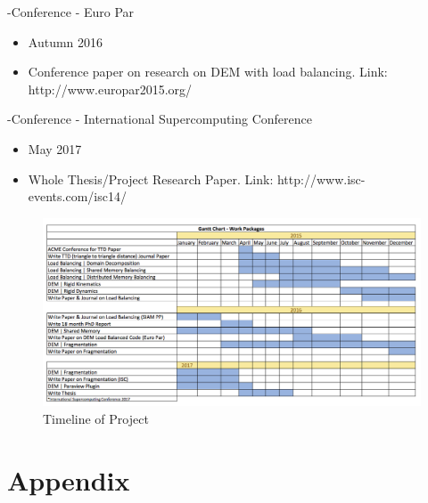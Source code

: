 \documentclass[times,12pt]{ACME2015article}
\begin{document}
-Conference - Euro Par
\begin{itemize}
\item Autumn 2016
\item Conference paper on research on DEM with load balancing. Link: http://www.europar2015.org/
\end{itemize}

-Conference - International Supercomputing Conference
\begin{itemize}
\item May 2017
\item Whole Thesis/Project Research Paper. Link: http://www.isc-events.com/isc14/
\end{itemize}

\begin{figure}
\centering
\includegraphics[width=1\textwidth]{chart} \protect\caption{\label{fig19}Timeline of Project}
\end{figure} 
\clearpage

\section{Appendix}
\end{document}
